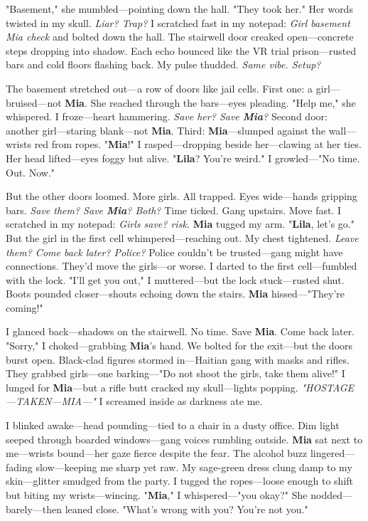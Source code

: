 \documentclass{article}
\begin{document}
"Basement," she mumbled—pointing down the hall. "They took her." Her words twisted in my skull. \textit{Liar? Trap?} I scratched fast in my notepad: \textit{Girl basement Mia check} and bolted down the hall. The stairwell door creaked open—concrete steps dropping into shadow. Each echo bounced like the VR trial prison—rusted bars and cold floors flashing back. My pulse thudded. \textit{Same vibe. Setup?}

The basement stretched out—a row of doors like jail cells. First one: a girl—bruised—not \textbf{Mia}. She reached through the bars—eyes pleading. "Help me," she whispered. I froze—heart hammering. \textit{Save her? Save \textbf{Mia}?} Second door: another girl—staring blank—not \textbf{Mia}. Third: \textbf{Mia}—slumped against the wall—wrists red from ropes. "\textbf{Mia}!" I rasped—dropping beside her—clawing at her ties. Her head lifted—eyes foggy but alive. "\textbf{Lila}? You’re weird." I growled—"No time. Out. Now."

But the other doors loomed. More girls. All trapped. Eyes wide—hands gripping bars. \textit{Save them? Save \textbf{Mia}? Both?} Time ticked. Gang upstairs. Move fast. I scratched in my notepad: \textit{Girls save? risk.} \textbf{Mia} tugged my arm. "\textbf{Lila}, let’s go." But the girl in the first cell whimpered—reaching out. My chest tightened. \textit{Leave them? Come back later? Police?} Police couldn’t be trusted—gang might have connections. They’d move the girls—or worse. I darted to the first cell—fumbled with the lock. "I’ll get you out," I muttered—but the lock stuck—rusted shut. Boots pounded closer—shouts echoing down the stairs. \textbf{Mia} hissed—"They’re coming!"

I glanced back—shadows on the stairwell. No time. Save \textbf{Mia}. Come back later. "Sorry," I choked—grabbing \textbf{Mia}’s hand. We bolted for the exit—but the doors burst open. Black-clad figures stormed in—Haitian gang with masks and rifles. They grabbed girls—one barking—"Do not shoot the girls, take them alive!" I lunged for \textbf{Mia}—but a rifle butt cracked my skull—lights popping. \textit{"HOSTAGE—TAKEN—MIA—"} I screamed inside as darkness ate me.

I blinked awake—head pounding—tied to a chair in a dusty office. Dim light seeped through boarded windows—gang voices rumbling outside. \textbf{Mia} sat next to me—wrists bound—her gaze fierce despite the fear. The alcohol buzz lingered—fading slow—keeping me sharp yet raw. My sage-green dress clung damp to my skin—glitter smudged from the party. I tugged the ropes—loose enough to shift but biting my wrists—wincing. "\textbf{Mia}," I whispered—"you okay?" She nodded—barely—then leaned close. "What’s wrong with you? You’re not you."
\end{document}
